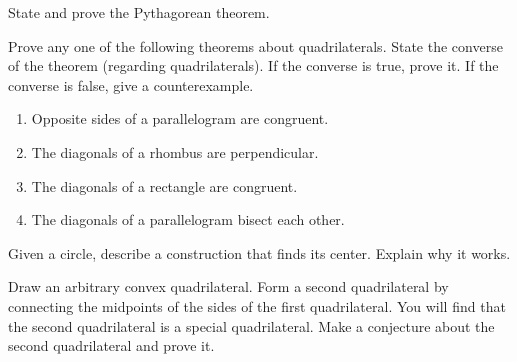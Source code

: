 \begin{prob}
State and prove the Pythagorean theorem.
\end{prob}

\begin{prob}
Prove any one of the following theorems about quadrilaterals.  State the converse of the theorem (regarding quadrilaterals).  If the converse is true, prove it.  If the converse is false, give a counterexample.  
\begin{enumerate}
\item Opposite sides of a parallelogram are congruent.
\item The diagonals of a rhombus are perpendicular.
\item The diagonals of a rectangle are congruent.
\item The diagonals of a parallelogram bisect each other.
\end{enumerate}
\end{prob}

\begin{prob}
Given a circle, describe a construction that finds its center.  Explain why it works.  
\end{prob}

\begin{prob}
Draw an arbitrary convex quadrilateral.  Form a second quadrilateral by connecting the 
midpoints of the sides of the first quadrilateral.  You will find that the second quadrilateral 
is a special quadrilateral.  Make a conjecture about the second quadrilateral and prove it.  
\end{prob}

%
